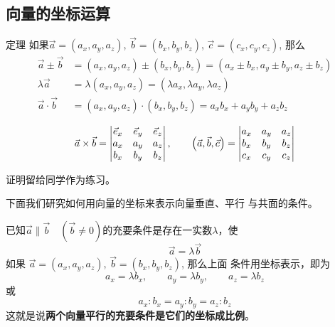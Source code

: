\subsection{向量的坐标运算}

\begin{blk}{定理}
     如果$\vec{a}=(a_x,a_y,a_z)$, $\vec{b}=(b_x, b_y,b_z)$, 
$\vec{c}=(c_x,c_y,c_z)$, 那么
\[\begin{split}
    \vec{a}\pm \vec{b}&=(a_x,a_y,a_z)\pm (b_x,b_y,b_z)
=(a_x\pm b_x,a_y\pm b_y,a_z\pm b_z)\\
\lambda\vec{a}&=\lambda(a_x, a_y,a_z)=(\lambda a_x,\lambda 
a_y,\lambda a_z)\\
\vec{a}\cdot \vec{b}&=(a_x, a_y, a_z)\cdot (b_x,b_y,b_z)
=a_xb_x+a_yb_y+a_zb_z\\
\end{split}\]
\[\vec{a}\times \vec{b}=\begin{vmatrix}
  \vec{e}_x&\vec{e}_y&\vec{e}_z\\
  a_x&a_y&a_z\\
  b_x&b_y&b_z  
\end{vmatrix},\qquad \left(\vec{a},\vec{b},\vec{c}\right)=\begin{vmatrix}
    a_x&a_y&a_z\\
    b_x&b_y&b_z\\  
    c_x&c_y&c_z
\end{vmatrix}\]
\end{blk}


证明留给同学作为练习。

下面我们研究如何用向量的坐标来表示向量垂直、平行
与共面的条件。

已知$\vec{a}\parallel \vec{b}\quad (\vec{b}\ne 0)$的充要条件是存在一实数$\lambda$，使
$$\vec{a}=\lambda\vec{b}$$
如果
$\vec{a}=(a_x,a_y,a_z)$, $\vec{b}=(b_x,b_y,b_z)$, 那么上面
条件用坐标表示，即为
\begin{equation}
    a_x=\lambda b_x,\qquad  a_y=\lambda b_y,\qquad  a_z=\lambda b_z
\end{equation}
或
\begin{equation}
    a_x:b_x=a_y:b_y=a_z:b_z
\end{equation}
这就是说\textbf{两个向量平行的充要条件是它们的坐标成比例}。


